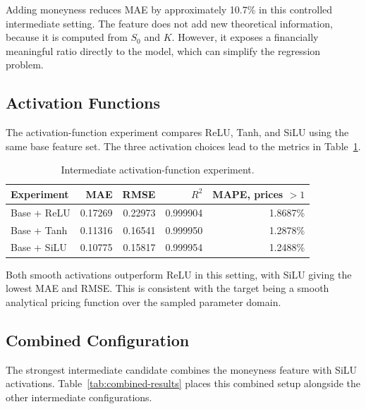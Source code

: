Adding moneyness reduces MAE by approximately 10.7\% in this controlled intermediate setting.
The feature does not add new theoretical information, because it is computed from $S_0$ and $K$.
However, it exposes a financially meaningful ratio directly to the model, which can simplify the regression problem.

\subsection{Activation Functions}

The activation-function experiment compares ReLU, Tanh, and SiLU using the same base feature set.
The three activation choices lead to the metrics in Table~\ref{tab:activation-results}.

\begin{table}[H]
    \centering
    \begin{tabular}{lrrrr}
        \toprule
        Experiment & MAE & RMSE & $R^2$ & MAPE, prices $> 1$ \\
        \midrule
        Base + ReLU & 0.17269 & 0.22973 & 0.999904 & 1.8687\% \\
        Base + Tanh & 0.11316 & 0.16541 & 0.999950 & 1.2878\% \\
        Base + SiLU & 0.10775 & 0.15817 & 0.999954 & 1.2488\% \\
        \bottomrule
    \end{tabular}
    \caption{Intermediate activation-function experiment.}
    \label{tab:activation-results}
\end{table}

Both smooth activations outperform ReLU in this setting, with SiLU giving the lowest MAE and RMSE.
This is consistent with the target being a smooth analytical pricing function over the sampled parameter domain.

\subsection{Combined Configuration}

The strongest intermediate candidate combines the moneyness feature with SiLU activations.
Table~\ref{tab:combined-results} places this combined setup alongside the other intermediate configurations.

